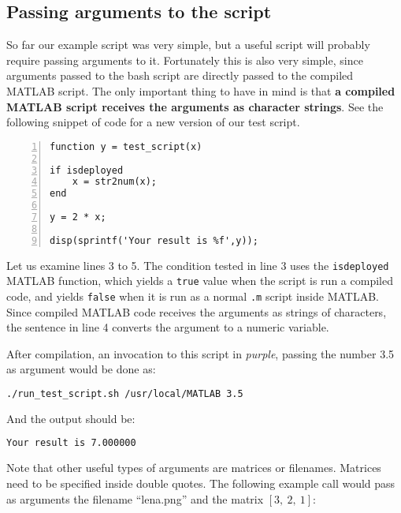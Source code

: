 \subsection{Passing arguments to the script}
So far our example script was very simple, but a useful script will probably
require passing arguments to it. Fortunately this is also very simple, since
arguments passed to the bash script are directly passed to the compiled MATLAB
script. The only important thing to have in mind is that \textbf{a compiled
  MATLAB script receives the arguments as character strings}. See the following
snippet of code for a new version of our test script.

\begin{lstlisting}[numbers=left,title={Second version of \texttt{test\_script.m}},captionpos=b]
function y = test_script(x)

if isdeployed
    x = str2num(x);
end

y = 2 * x;

disp(sprintf('Your result is %f',y));
\end{lstlisting}

Let us examine lines 3 to 5. The condition tested in line 3 uses the
\texttt{isdeployed} MATLAB function, which yields a \texttt{true} value when the
script is run a compiled code, and yields \texttt{false} when it is run as a
normal \texttt{.m} script inside MATLAB. Since compiled MATLAB code receives the
arguments as strings of characters, the sentence in line 4 converts the argument
to a numeric variable.

After compilation, an invocation to this script in \emph{purple}, passing the number 3.5
as argument would be done as:

\begin{lstlisting}[language=bash]
./run_test_script.sh /usr/local/MATLAB 3.5
\end{lstlisting}

And the output should be:

\begin{lstlisting}[language=bash]
Your result is 7.000000
\end{lstlisting}

Note that other useful types of arguments are matrices or filenames. Matrices
need to be specified inside double quotes. The following example call would pass as arguments the filename ``lena.png'' and the matrix $[3,~2,~1]$:

